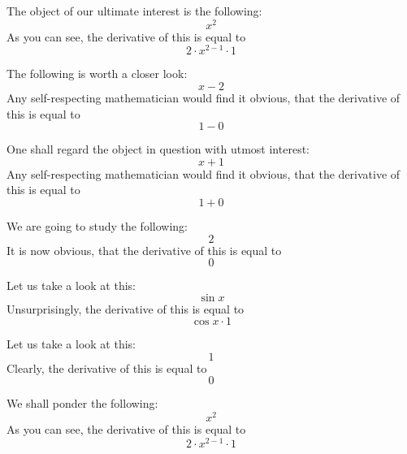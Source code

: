 \documentclass{article}
\begin{document}
The object of our ultimate interest is the following:
\begin{equation}
x ^{2 } 
\end{equation}
As you can see, the derivative of this is equal to
\begin{equation}
2 \cdot x ^{2 - 1 } \cdot 1 
\end{equation}

The following is worth a closer look:
\begin{equation}
x - 2 
\end{equation}
Any self-respecting mathematician would find it obvious, that the derivative of this is equal to
\begin{equation}
1 - 0 
\end{equation}

One shall regard the object in question with utmost interest:
\begin{equation}
x + 1 
\end{equation}
Any self-respecting mathematician would find it obvious, that the derivative of this is equal to
\begin{equation}
1 + 0 
\end{equation}

We are going to study the following:
\begin{equation}
2 
\end{equation}
It is now obvious, that the derivative of this is equal to
\begin{equation}
0 
\end{equation}

Let us take a look at this:
\begin{equation}
\sin x 
\end{equation}
Unsurprisingly, the derivative of this is equal to
\begin{equation}
\cos x \cdot 1 
\end{equation}

Let us take a look at this:
\begin{equation}
1 
\end{equation}
Clearly, the derivative of this is equal to
\begin{equation}
0 
\end{equation}

We shall ponder the following:
\begin{equation}
x ^{2 } 
\end{equation}
As you can see, the derivative of this is equal to
\begin{equation}
2 \cdot x ^{2 - 1 } \cdot 1 
\end{equation}
\end{document}
